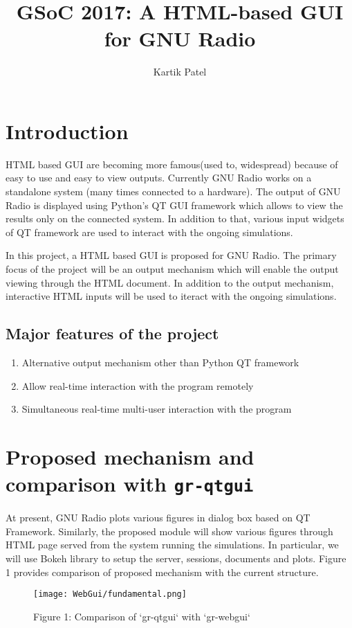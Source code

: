 \documentclass[a4paper, 11pt]{article}
\title{GSoC 2017: A HTML-based GUI for GNU Radio}
\author{Kartik Patel}
\begin{document}
\maketitle

\section{Introduction}
HTML based GUI are becoming more famous(used to, widespread) because of easy to use and easy to view outputs. Currently GNU Radio works on a standalone system (many times connected to a hardware). The output of GNU Radio is displayed using Python's QT GUI framework which allows to view the results only on the connected system. In addition to that, various input widgets of QT framework are used to interact with the ongoing simulations.

In this project, a HTML based GUI is proposed for GNU Radio. The primary focus of the project will be an output mechanism which will enable the output viewing through the HTML document. In addition to the output mechanism, interactive HTML inputs will be used to iteract with the ongoing simulations.

\subsection{Major features of the project}
\begin{enumerate}
\item Alternative output mechanism other than Python QT framework
\item Allow real-time interaction with the program remotely
\item Simultaneous real-time multi-user interaction with the program
\end{enumerate}

\section{Proposed mechanism and comparison with \texttt{gr-qtgui}}
At present, GNU Radio plots various figures in dialog box based on QT Framework. Similarly, the proposed module will show various figures through HTML page served from the system running the simulations. In particular, we will use Bokeh library to setup the server, sessions, documents and plots. Figure 1 provides comparison of proposed mechanism with the current structure.

\begin{figure}
\texttt{[image: WebGui/fundamental.png]}
\caption{Figure 1: Comparison of `gr-qtgui` with `gr-webgui`}
\end{figure}
\end{document}
